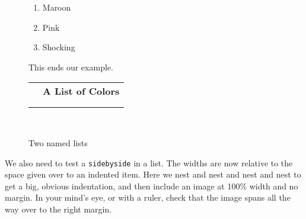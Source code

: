 \documentclass[10pt,]{article}
\theoremstyle{plain}
\theoremstyle{definition}
\theoremstyle{definition}
\theoremstyle{definition}
\theoremstyle{definition}
\theoremstyle{definition}
\theoremstyle{definition}
\numberwithin{equation}{section}
\newlength{\panelmax}
\begin{document}
\begin{figure}
{{{{\begin{enumerate}
\begin{enumerate}
\item\hypertarget{li-243}{}Maroon%
\item\hypertarget{li-244}{}Pink%
\item\hypertarget{li-245}{}Shocking%
\end{enumerate}
%
\end{enumerate}
\bigbreak
\hypertarget{p-695}{}%
This ends our example.%
}}}
\ifdefined\phBlist\else\newlength{\phBlist}\fi%
\setlength{\phBlist}{\ht\panelboxBlist+\dp\panelboxBlist}
\settototalheight{\phBlist}{\usebox{\panelboxBlist}}
\setlength{\panelmax}{\maxof{\panelmax}{\phBlist}}
\leavevmode%
\setlength{\tabcolsep}{0.025\linewidth}
\par\medskip\noindent
\hspace*{0.025\linewidth}%
\begin{tabular}{@{}*{2}{c}@{}}
&
\parbox[t]{0.6\linewidth}{\centering{}\textbf{A List of Colors}}\tabularnewline
\begin{minipage}[c][\panelmax][t]{0.3\linewidth}\usebox{\panelboxAlist}\end{minipage}&
\begin{minipage}[c][\panelmax][t]{0.6\linewidth}\usebox{\panelboxBlist}\end{minipage}\tabularnewline
\parbox[t]{0.3\linewidth}{
}&
\parbox[t]{0.6\linewidth}{
}\end{tabular}\\
}%
\caption{Two named lists\label{figure-72}}
\end{figure}
\hypertarget{p-696}{}%
We also need to test a \lstinline?sidebyside? in a list.  The widths are now relative to the space given over to an indented item.  Here we nest and nest and nest and nest to get a big, obvious indentation, and then include an image at 100\% width and no margin.  In your mind's eye, or with a ruler, check that the image spans all the way over to the right margin.\leavevmode%
\end{document}
